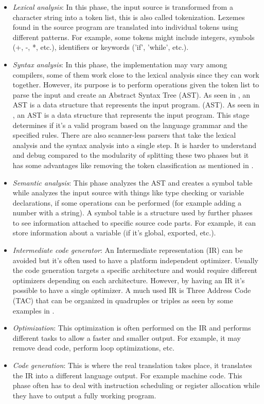 \begin{itemize}
    \item \emph{Lexical analysis}: In this phase, the input source is transformed from a character string into a token list, this is also called
        tokenization. Lexemes found in the source program are translated into individual tokens using different patterns. For example, some tokens
        might include integers, symbols (+, -, *, etc.), identifiers or keywords ('if', 'while', etc.).
    \item \emph{Syntax analysis}: In this phase, the implementation may vary among compilers, some of them work close to the lexical analysis since they
        can work together. However, its purpose is to perform operations given the token list to parse the input and create an Abstract Syntax Tree
        (AST). As seen in \autocite[Section~5.2.1]{engineering_a_compiler}, an AST is a data structure that represents the input program.
        (AST). As seen in \autocite[Section~5.2.1]{engineering_a_compiler}, an AST is a data structure that represents the input program.
        This stage determines if it's a valid program based on the language grammar and the specified rules.
        There are also scanner-less parsers that take the lexical analysis and the syntax analysis into a single step. It is harder to understand and
        debug compared to the modularity of splitting these two phases but it has some advantages like removing the token classification as mentioned
        in \autocite{scannerless_parsing}.
    \item \emph{Semantic analysis}: This phase analyzes the AST and creates a symbol table while analyzes the input source with things like type checking or
        variable declarations, if some operations can be performed (for example adding a number with a string). A symbol table is a structure used
        by further phases to see information attached to specific source code parts. For example, it can store information about a variable
        (if it's global, exported, etc.).
    \item \emph{Intermediate code generator}: An Intermediate representation (IR) can be avoided but it's often used to have a platform independent
        optimizer. Usually the code generation targets a specific architecture and would require different optimizers depending on each architecture.
        However, by having an IR it's possible to have a single optimizer. A much used IR is Three Address Code
        (TAC) that can be organized in quadruples or triples as seen by some examples in \autocite{three_address_code_examples}.
    \item \emph{Optimization}: This optimization is often performed on the IR and performs different tasks to allow a faster and smaller output. For example, it may
        remove dead code, perform loop optimizations, etc.
    \item \emph{Code generation}: This is where the real translation takes place, it translates the IR into a different language output. For example machine code.
        This phase often has to deal with instruction scheduling or register allocation while they have to output a fully working program.
\end{itemize}

